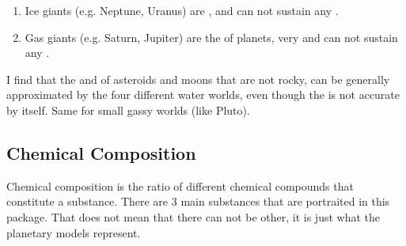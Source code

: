 \documentclass[letterpaper,10pt,english]{sphinxmanual}
\begin{document}
\begin{enumerate}
\item {} 
\sphinxAtStartPar
Ice giants (e.g. Neptune, Uranus) are {\hyperref[\detokenize{quantities/geometric/radius:id1}]{}}, {\hyperref[\detokenize{quantities/material/density:id1}]{}} and can not sustain any {\hyperref[\detokenize{quantities/surface/internal_heating/tectonic_activity:id1}]{}}.

\item {} 
\sphinxAtStartPar
Gas giants (e.g. Saturn, Jupiter) are the {\hyperref[\detokenize{quantities/geometric/radius:id1}]{}} of planets, very {\hyperref[\detokenize{quantities/material/density:id1}]{}} and can not sustain any {\hyperref[\detokenize{quantities/surface/internal_heating/tectonic_activity:id1}]{}}.

\end{enumerate}

\sphinxAtStartPar
I find that the {\hyperref[\detokenize{quantities/material/density:id1}]{}} and {\hyperref[\detokenize{quantities/geometric/radius:id1}]{}}
of asteroids and moons that are not rocky,
can be generally approximated by the four different water worlds,
even though the {\hyperref[\detokenize{quantities/material/chemical_composition:id1}]{}}
is not accurate by itself.
Same for small gassy worlds (like Pluto).


\subsection{Chemical Composition}
\label{\detokenize{quantities/material/chemical_composition:chemical-composition}}\label{\detokenize{quantities/material/chemical_composition::doc}}\label{\detokenize{quantities/material/chemical_composition:id1}}
\sphinxAtStartPar
Chemical composition is the ratio of different chemical compounds that constitute a substance.
There are 3 main substances that are portraited in this package.
That does not mean that there can not be other, it is just what the planetary {\hyperref[\detokenize{quantities/geometric/radius:id1}]{}} models represent.
\end{document}
